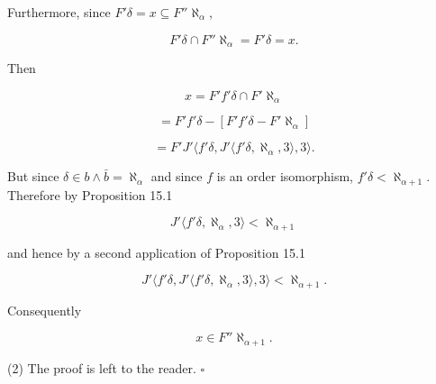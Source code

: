 Furthermore, since $F' \delta = x \subseteq F'' \aleph_\alpha$,

$$F' \delta \cap F'' \aleph_\alpha = F' \delta = x.$$

Then

$$x = F' f' \delta \cap F' \aleph_\alpha$$

$$= F' f' \delta - [F' f' \delta - F' \aleph_\alpha]$$

$$= F' J' \langle f' \delta, J' \langle f' \delta, \aleph_\alpha, 3 \rangle, 3 \rangle.$$

But since $\delta \in b \land \bar{b} = \aleph_\alpha$ and since $f$ is an order isomorphism, $f' \delta < \aleph_{\alpha+1}$. Therefore by Proposition 15.1

$$J' \langle f' \delta, \aleph_\alpha, 3 \rangle < \aleph_{\alpha+1}$$

and hence by a second application of Proposition 15.1

$$J' \langle f' \delta, J' \langle f' \delta, \aleph_\alpha, 3 \rangle, 3 \rangle < \aleph_{\alpha+1}.$$

Consequently

$$x \in F'' \aleph_{\alpha+1}.$$

(2) The proof is left to the reader. $\square$
